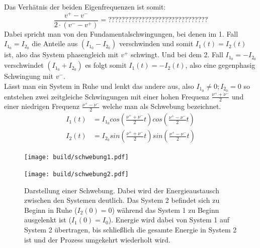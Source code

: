 Das Verhätnis der beiden Eigenfrequenzen ist somit:
\begin{equation}
    \frac{v^+-v^-}{2\cdot(v^--v^+)}=??????????????????????????????
\end{equation}
Dabei spricht man von den Fundamentalschwingungen, bei denen im 1. Fall $I_{1_0}=I_{2_0}$ die Anteile aus
$(I_{1_0}-I_{2_0})$ verschwinden und somit $I_1(t)=I_2(t)$ ist, also das System phasengleich mit $v^+$ schwingt. 
Und bei dem 2. Fall $I_{1_0}=-I_{2_0}$ verschwindet $(I_{1_0}+I_{2_0})$ es 
folgt somit $I_1(t)=-I_2(t)$, also eine gegenphasig Schwingung mit $v^-$.\\
Lässt man ein System in Ruhe und lenkt das andere aus, also $I_{1_0}\neq 0; I_{2_0}=0$
so entstehen zwei zeitgleiche Schwingungen mit einer hohen Frequenz $\frac{\nu^+ + \nu^-}{2}$
und einer niedrigen Frequenz $\frac{\nu^+ - \nu^-}{2}$ welche man als Schwebung bezeichnet.
\begin{align}
    I_1\left(t\right)&=I_{1_0}cos\left(\frac{\nu^+ + \nu^-}{2}t\right)cos\left(\frac{\nu^+ - \nu^-}{2}t\right)\\ 
    I_2\left(t\right)&=I_{2_0}sin\left(\frac{\nu^+ + \nu^-}{2}t\right)sin\left(\frac{\nu^+ - \nu^-}{2}t\right)
\end{align}
\begin{figure}[H]
    \centering 
    \texttt{[image: build/schwebung1.pdf]}
\end{figure}
\begin{figure}[H]
    \centering
    \texttt{[image: build/schwebung2.pdf]}
    \caption{
        Darstellung einer Schwebung. Dabei wird der Energieaustausch zwischen den Systemen deutlich.
        Das System 2 befindet sich zu Beginn in Ruhe ($I_2(0)=0$) während das System 1 zu Beginn ausgelenkt ist
        ($I_1(0)=I_0$). Energie wird dabei von System 1 auf System 2 übertragen, bis schließlich die gesamte 
        Energie in System 2 ist und der Prozess umgekehrt wiederholt wird.
    }
\end{figure}


\newpage


